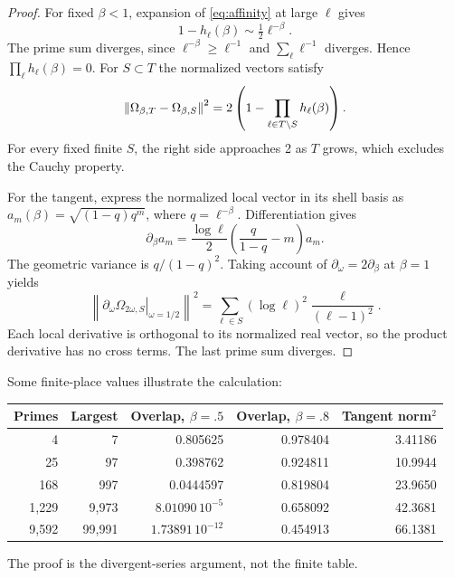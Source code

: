 \begin{proof}
For fixed $\beta<1$, expansion of \eqref{eq:affinity} at large $\ell$
gives
\begin{equation}
 1-h_\ell(\beta)\sim\tfrac12\ell^{-\beta}.
\end{equation}
The prime sum diverges, since $\ell^{-\beta}\ge\ell^{-1}$ and
$\sum_\ell\ell^{-1}$ diverges. Hence $\prod_\ell h_\ell(\beta)=0$.
For $S\subset T$ the normalized vectors satisfy
\begin{equation}
 \left\lVert\Omega_{\beta,T}-\Omega_{\beta,S}\right\rVert^2
 =2\left(1-\prod_{\ell\in T\setminus S}h_\ell(\beta)\right).
 \label{eq:noncauchy}
\end{equation}
For every fixed finite $S$, the right side approaches 2 as $T$ grows,
which excludes the Cauchy property.

For the tangent, express the normalized local vector in its shell basis
as $a_m(\beta)=\sqrt{(1-q)q^m}$, where $q=\ell^{-\beta}$.
Differentiation gives
\begin{equation}
 \partial_\beta a_m
 =\frac{\log\ell}{2}\left(\frac{q}{1-q}-m\right)a_m.
\end{equation}
The geometric variance is $q/(1-q)^2$. Taking account of
$\partial_\omega=2\partial_\beta$ at $\beta=1$ yields
\begin{equation}
 \left\|\left.\partial_\omega\Omega_{2\omega,S}
                  \right|_{\omega=1/2}\right\|^2
 =\sum_{\ell\in S}(\log\ell)^2\frac{\ell}{(\ell-1)^2}.
 \label{eq:tangent_norm}
\end{equation}
Each local derivative is orthogonal to its normalized real vector,
so the product derivative has no cross terms. The last prime sum
diverges.
\end{proof}

Some finite-place values illustrate the calculation:
\begin{center}
\small
\begin{tabular}{@{}rrrrr@{}}
\toprule
Primes & Largest & Overlap, $\beta=.5$ & Overlap, $\beta=.8$ & Tangent norm$^2$\\
\midrule
4 & 7 & 0.805625 & 0.978404 & 3.41186\\
25 & 97 & 0.398762 & 0.924811 & 10.9944\\
168 & 997 & 0.0444597 & 0.819804 & 23.9650\\
1,229 & 9,973 & $8.01090\,10^{-5}$ & 0.658092 & 42.3681\\
9,592 & 99,991 & $1.73891\,10^{-12}$ & 0.454913 & 66.1381\\
\bottomrule
\end{tabular}
\end{center}
The proof is the divergent-series argument, not the finite table.

